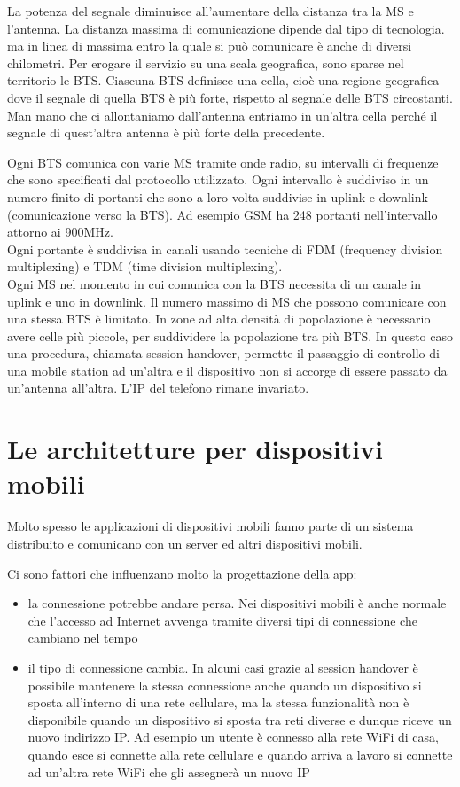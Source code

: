 La potenza del segnale diminuisce all'aumentare della distanza tra la MS e l’antenna.
La distanza massima di comunicazione dipende dal tipo di tecnologia.
ma in linea di massima entro la quale si può comunicare è anche di diversi chilometri. 
Per erogare il servizio su una scala geografica, sono sparse nel territorio le BTS. 
Ciascuna BTS definisce una cella, cioè una regione geografica dove il segnale di quella BTS è più forte, rispetto al segnale delle BTS circostanti. 
Man mano che ci allontaniamo dall'antenna entriamo in un'altra cella perché il segnale di quest'altra antenna è più forte della precedente. 

Ogni BTS comunica con varie MS tramite onde radio, su intervalli di frequenze che sono specificati dal protocollo utilizzato.
Ogni intervallo è suddiviso in un numero finito di portanti che sono a loro volta suddivise in uplink e downlink (comunicazione verso la BTS).
Ad esempio GSM ha 248 portanti nell'intervallo attorno ai 900MHz.
\\ Ogni portante è suddivisa in canali usando tecniche di FDM (frequency division multiplexing) e TDM (time division multiplexing).
\\ Ogni MS nel momento in cui comunica con la BTS necessita di un canale in uplink e uno in downlink. Il numero massimo di MS che possono comunicare con una stessa BTS è limitato. 
In zone ad alta densità di popolazione è necessario avere celle più piccole, per suddividere la popolazione tra più BTS.
In questo caso una procedura, chiamata session handover, permette il passaggio di controllo di una mobile station ad un'altra e il dispositivo non si accorge di essere passato da un'antenna all'altra. L'IP del telefono rimane invariato. 

\section{Le architetture per dispositivi mobili}
Molto spesso le applicazioni di dispositivi mobili fanno parte di un sistema distribuito e comunicano con un server ed altri dispositivi mobili. 

Ci sono fattori che influenzano molto la progettazione della app:
\begin{itemize}
    \item la connessione potrebbe andare persa. Nei dispositivi mobili è anche normale che l'accesso ad Internet avvenga tramite diversi tipi di connessione che cambiano nel tempo
    \item il tipo di connessione cambia. In alcuni casi grazie al session handover è possibile mantenere la stessa connessione anche quando un dispositivo si sposta all'interno di una rete cellulare, ma la stessa funzionalità non è disponibile quando un dispositivo si sposta tra reti diverse e dunque riceve un nuovo indirizzo IP. Ad esempio un utente è connesso alla rete WiFi di casa, quando esce si connette alla rete cellulare e quando arriva a lavoro si connette ad un'altra rete WiFi che gli assegnerà un nuovo IP
\end{itemize}

